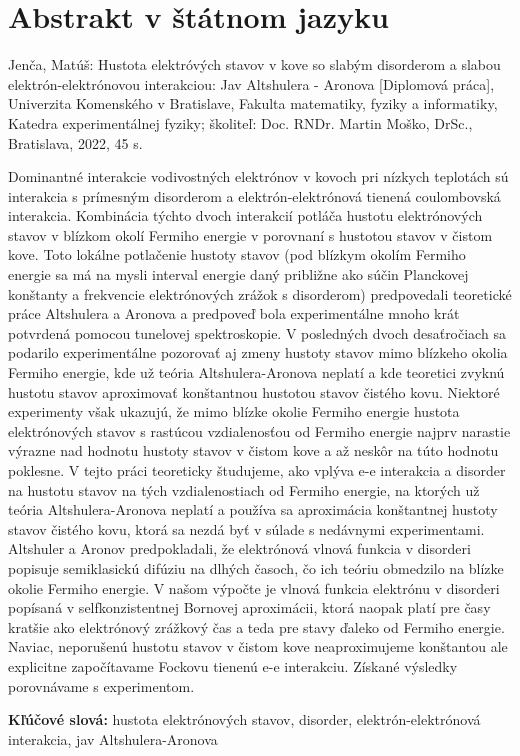 \thispagestyle{empty}
\section*{Abstrakt v štátnom jazyku}

Jenča, Matúš: Hustota elektróvých stavov v kove so slabým disorderom a slabou elektrón-elektrónovou interakciou: Jav Altshulera - Aronova [Diplomová práca], Univerzita Komenského v Bratislave, Fakulta matematiky, fyziky a informatiky, Katedra experimentálnej fyziky; školiteľ: Doc. RNDr. Martin Moško, DrSc., Bratislava, 2022,  45 s.

Dominantné interakcie vodivostných elektrónov v kovoch pri nízkych teplotách sú interakcia s prímesným disorderom a elektrón-elektrónová tienená coulombovská interakcia. 
Kombinácia týchto dvoch interakcií potláča
hustotu elektrónových stavov v blízkom okolí Fermiho
energie v porovnaní s hustotou stavov v čistom kove. Toto lokálne potlačenie hustoty stavov (pod blízkym okolím Fermiho energie sa má na mysli interval energie daný približne ako súčin Planckovej konštanty a frekvencie elektrónových zrážok s disorderom) predpovedali teoretické práce Altshulera a Aronova a predpoveď bola experimentálne mnoho krát potvrdená pomocou tunelovej
spektroskopie. V posledných dvoch desaťročiach sa podarilo experimentálne pozorovať aj zmeny hustoty stavov mimo
blízkeho okolia Fermiho energie, kde už teória Altshulera-Aronova neplatí a kde teoretici zvyknú hustotu stavov aproximovať konštantnou hustotou stavov čistého kovu.
Niektoré experimenty však ukazujú, že mimo blízke okolie Fermiho energie hustota elektrónových stavov s rastúcou vzdialenosťou od Fermiho energie najprv narastie výrazne nad hodnotu hustoty stavov v čistom kove a až neskôr na túto hodnotu poklesne.
V tejto práci teoreticky študujeme, ako vplýva e-e interakcia a disorder na 
hustotu stavov na tých vzdialenostiach od Fermiho energie, na ktorých už teória Altshulera-Aronova neplatí a používa sa aproximácia konštantnej  hustoty stavov čistého kovu, ktorá 
sa nezdá byť v súlade s nedávnymi experimentami. Altshuler a Aronov predpokladali, že elektrónová vlnová funkcia v disorderi popisuje semiklasickú difúziu na dlhých časoch, čo ich teóriu obmedzilo na blízke okolie Fermiho energie. V našom výpočte je vlnová funkcia elektrónu v disorderi popísaná v selfkonzistentnej Bornovej aproximácii, ktorá naopak platí pre časy kratšie ako elektrónový zrážkový čas a teda pre stavy ďaleko od Fermiho energie. Naviac, neporušenú hustotu stavov v čistom kove neaproximujeme konštantou ale explicitne započítavame Fockovu tienenú e-e interakciu. Získané výsledky porovnávame s experimentom.

\begin{flushleft}
\textbf{Kľúčové slová:} hustota elektrónových stavov, disorder, elektrón-elektrónová interakcia,  jav Altshulera-Aronova
\end{flushleft}